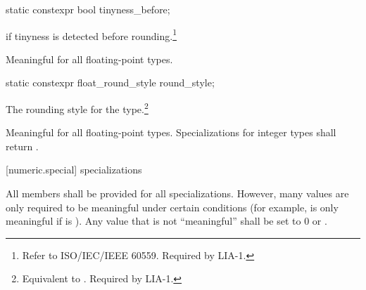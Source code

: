 %
\begin{itemdecl}
static constexpr bool tinyness_before;
\end{itemdecl}

\begin{itemdescr}
\pnum
{}
if tinyness is detected before rounding.\footnote{Refer to
ISO/IEC/IEEE 60559.
Required by LIA-1.}

\pnum
Meaningful for all floating-point types.
\end{itemdescr}

%
\begin{itemdecl}
static constexpr float_round_style round_style;
\end{itemdecl}

\begin{itemdescr}
\pnum
The rounding style for the type.\footnote{Equivalent to .
Required by LIA-1.}

\pnum
Meaningful for all floating-point types.
Specializations for integer types shall return
.
\end{itemdescr}

[numeric.special]{ specializations}

\pnum
All members shall be provided for all specializations.
However, many values are only required to be meaningful under certain
conditions
(for example,
is only meaningful if
is
).
Any value that is not ``meaningful'' shall be set to 0 or
.

